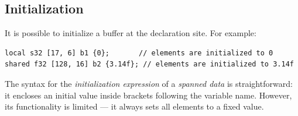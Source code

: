 \subsection*{Initialization}

It is possible to initialize a buffer at the declaration site. For example:

\begin{lstlisting}[language=croqtile,caption={Initialization}]
local s32 [17, 6] b1 {0};       // elements are initialized to 0
shared f32 [128, 16] b2 {3.14f}; // elements are initialized to 3.14f
\end{lstlisting}

The syntax for the \emph{initialization expression} of a \emph{spanned data} is straightforward: it encloses an initial value inside brackets following the variable name. However, its functionality is limited --- it always sets all elements to a fixed value.
